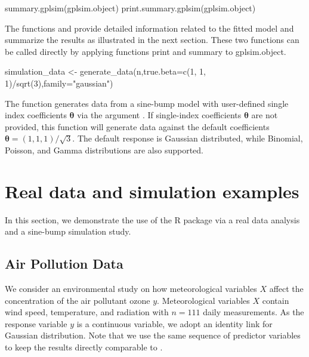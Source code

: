 \begin{example}
  summary.gplsim(gplsim.object)
  print.summary.gplsim(gplsim.object)
\end{example}

The functions  and  provide detailed information related to the fitted model and summarize the results as illustrated in the next section. These two functions can be called directly by applying functions print and summary to gplsim.object. 

\begin{example}
  simulation_data <- generate_data(n,true.beta=c(1, 1, 1)/sqrt(3),family="gaussian")
\end{example}

The function  generates data from a sine-bump model with user-defined single index coefficients $\boldsymbol{\theta}$ via the argument . If single-index coefficients $\boldsymbol{\theta}$ are not provided, this function will generate data against the default coefficients $\boldsymbol{\theta} = (1,1,1) / \sqrt{3}$. The default response is Gaussian distributed, while Binomial, Poisson, and Gamma distributions are also supported.

\section{Real data and simulation examples}

In this section, we demonstrate the use of the R package  via a real data analysis and a sine-bump simulation study. 


\subsection{Air Pollution Data}\label{air-pollution-data}
  
We consider an environmental study on how meteorological variables $X$ affect the concentration of the air pollutant ozone $y$. Meteorological variables $X$ contain wind speed, temperature, and radiation with $n=111$ daily measurements. As the response variable $y$ is a continuous variable, we adopt an identity link for Gaussian distribution. Note that we use the same sequence of predictor variables to keep the results directly comparable to \cite{yu_penalized_2002}.

\begin{Schunk}
\end{Schunk}

